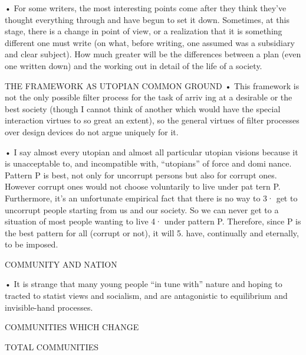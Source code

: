 \documentclass[11pt,openany]{book}
\begin{document}
{• For some writers, the most interesting points come after they think they've thought everything through and have begun to set it down. Sometimes, at this stage, there is a change in point of view, or a realization that it is something different one must write (on what, before writing, one assumed was a subsidiary and clear subject). How much greater will be the differences between a plan (even one written down) and the working out in detail of the life of a society.\par

THE FRAMEWORK AS UTOPIAN COMMON GROUND • This framework is not the only possible filter process for the task of arriv ing at a desirable or the best society (though I cannot think of another which would have the special interaction virtues to so great an extent), so the general virtues of filter processes over design devices do not argue uniquely for it.\par

• I say almost every utopian and almost all particular utopian visions because it is unacceptable to, and incompatible with, ``utopians'' of force and domi nance. Pattern P is best, not only for uncorrupt persons but also for corrupt ones. However corrupt ones would not choose voluntarily to live under pat tern P. Furthermore, it's an unfortunate empirical fact that there is no way to 3· get to uncorrupt people starting from us and our society. So we can never get to a situation of most people wanting to live 4· under pattern P. Therefore, since P is the best pattern for all (corrupt or not), it will 5. have, continually and eternally, to be imposed.\par

COMMUNITY AND NATION\par

• It is strange that many young people ``in tune with'' nature and hoping to tracted to statist views and socialism, and are antagonistic to equilibrium and invisible-hand processes.\par

COMMUNITIES WHICH CHANGE\par

TOTAL COMMUNITIES\par

}
\end{document}
